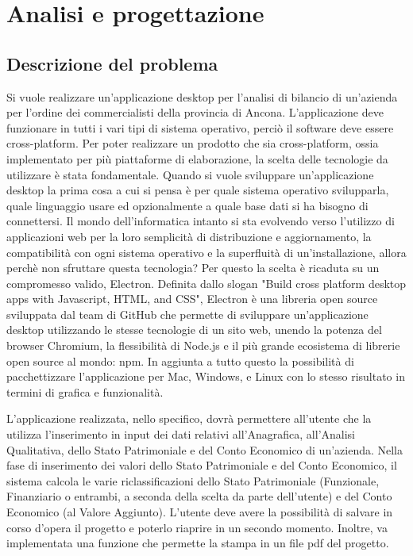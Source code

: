
\chapter{Analisi e progettazione}


\section{Descrizione del problema}

Si vuole realizzare un'applicazione desktop per l'analisi di bilancio di un'azienda per l'ordine dei commercialisti della provincia di Ancona.
L'applicazione deve funzionare in tutti i vari tipi di sistema operativo, perciò il software deve essere cross-platform.
Per poter realizzare un prodotto che sia cross-platform, ossia implementato per più piattaforme di elaborazione, la scelta delle tecnologie da utilizzare è stata fondamentale.
Quando si vuole sviluppare un'applicazione desktop la prima cosa a cui si pensa è per quale sistema operativo svilupparla, quale linguaggio usare ed opzionalmente a quale base dati si ha bisogno di connettersi.
Il mondo dell'informatica intanto si sta evolvendo verso l'utilizzo di applicazioni web per la loro semplicità di distribuzione e aggiornamento, la compatibilità con ogni sistema operativo e la superfluità di un'installazione, allora perchè non sfruttare questa tecnologia?
Per questo la scelta è ricaduta su un compromesso valido, Electron.
Definita dallo slogan "Build cross platform desktop apps with Javascript, HTML, and CSS", Electron è una libreria open source sviluppata dal team di GitHub che permette di sviluppare un’applicazione desktop utilizzando le stesse tecnologie di un sito web, unendo la potenza del browser Chromium, la flessibilità di Node.js e il più grande ecosistema di librerie open source al mondo: npm. In aggiunta a tutto questo la possibilità di pacchettizzare l’applicazione per Mac, Windows, e Linux con lo stesso risultato in termini di grafica e funzionalità.

L'applicazione realizzata, nello specifico, dovrà permettere all'utente che la utilizza l'inserimento in input dei dati relativi all'Anagrafica, all'Analisi Qualitativa, dello Stato Patrimoniale e del Conto Economico di un'azienda.
Nella fase di inserimento dei valori dello Stato Patrimoniale e del Conto Economico, il sistema calcola le varie riclassificazioni dello Stato Patrimoniale (Funzionale, Finanziario o entrambi, a seconda della scelta da parte dell'utente) e del Conto Economico (al Valore Aggiunto).
L'utente deve avere la possibilità di salvare in corso d'opera il progetto e poterlo riaprire in un secondo momento.
Inoltre, va implementata una funzione che permette la stampa in un file pdf del progetto.


